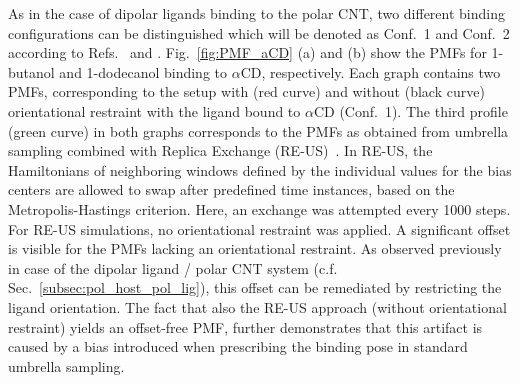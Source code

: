 \documentclass[9pt,lessons,pubversion]{livecoms}
\begin{document}
As in the case of dipolar ligands binding to the polar CNT, two different binding configurations can be distinguished which will be denoted as Conf.~1 and Conf.~2 according to Refs.~ and .
Fig.~\ref{fig:PMF_aCD} (a) and (b) show the PMFs for 1-butanol and 1-dodecanol binding to $\alpha$CD, respectively. 
Each graph contains two PMFs, corresponding to the setup with (red curve) and without (black curve) orientational restraint with the ligand bound to $\alpha$CD (Conf.~1).
The third profile (green curve) in both graphs corresponds to the PMFs as obtained from umbrella sampling combined with Replica Exchange (RE-US)~\cite{sugita2000multidimensional}. 
In RE-US, the Hamiltonians of neighboring windows defined by the individual values for the bias centers are allowed to swap after predefined time instances, based on the Metropolis-Hastings criterion. 
Here, an exchange was attempted every 1000 steps.  
For RE-US simulations, no orientational restraint was applied. 
A significant offset is visible for the PMFs lacking an orientational restraint. 
As observed previously in case of the dipolar ligand / polar CNT system (c.f. Sec.~\ref{subsec:pol_host_pol_lig}), this offset can be remediated by restricting the ligand orientation.
The fact that also the RE-US approach (without orientational restraint) yields an offset-free PMF, further demonstrates that this artifact is caused by a bias introduced when prescribing the binding pose in standard 
umbrella sampling.
\end{document}
